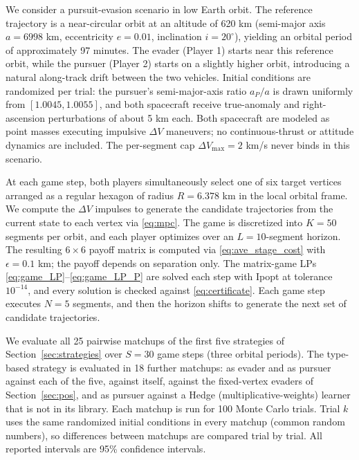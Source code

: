 \documentclass[letterpaper, 10 pt, conference]{ieeeconf}  %
\begin{document}
We consider a pursuit-evasion scenario in low Earth orbit. The reference trajectory is a near-circular orbit at an altitude of 620 km (semi-major axis $a = 6998$ km, eccentricity $e = 0.01$, inclination $i = 20^\circ$), yielding an orbital period of approximately 97 minutes. The evader (Player 1) starts near this reference orbit, while the pursuer (Player 2) starts on a slightly higher orbit, introducing a natural along-track drift between the two vehicles. Initial conditions are randomized per trial: the pursuer's semi-major-axis ratio $a_P/a$ is drawn uniformly from $[1.0045, 1.0055]$, and both spacecraft receive true-anomaly and right-ascension perturbations of about 5 km each. Both spacecraft are modeled as point masses executing impulsive $\Delta V$ maneuvers; no continuous-thrust or attitude dynamics are included. The per-segment cap $\Delta V_{\max} = 2$ km/s never binds in this scenario.

At each game step, both players simultaneously select one of six target vertices arranged as a regular hexagon of radius $R = 6.378$ km in the local orbital frame.
We compute the $\Delta V$ impulses to generate the candidate trajectories from the current state to each vertex via \eqref{eq:mpc}.
The game is discretized into $K = 50$ segments per orbit, and each player optimizes over an $L=10$-segment horizon. The resulting $6 \times 6$ payoff matrix is computed via \eqref{eq:ave_stage_cost} with $\epsilon = 0.1$ km; the payoff depends on separation only.
The matrix-game LPs \eqref{eq:game_LP}--\eqref{eq:game_LP_P} are solved each step with Ipopt \cite{wachter2006implementation} at tolerance $10^{-14}$, and every solution is checked against \eqref{eq:certificate}. Each game step executes $N=5$ segments, and then the horizon shifts to generate the next set of candidate trajectories.

We evaluate all 25 pairwise matchups of the first five strategies of Section~\ref{sec:strategies} over $S = 30$ game steps (three orbital periods). The type-based strategy is evaluated in 18 further matchups: as evader and as pursuer against each of the five, against itself, against the fixed-vertex evaders of Section~\ref{sec:pos}, and as pursuer against a Hedge (multiplicative-weights) learner that is not in its library. Each matchup is run for 100 Monte Carlo trials. Trial $k$ uses the same randomized initial conditions in every matchup (common random numbers), so differences between matchups are compared trial by trial. All reported intervals are 95\% confidence intervals.
\end{document}
